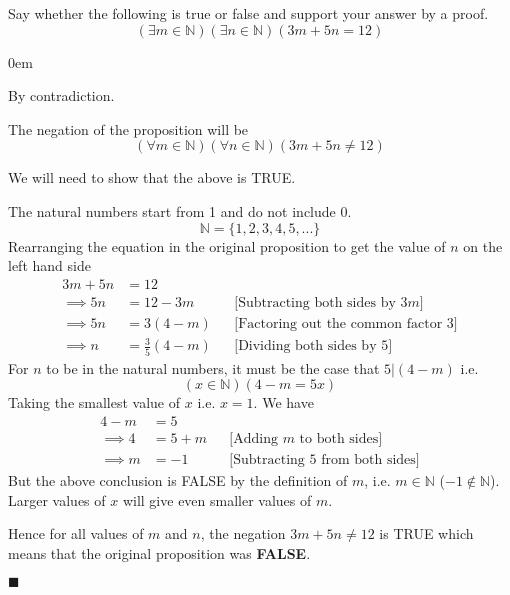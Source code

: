 \documentclass[12pt]{article}
\newcommand{\N}{\mathbb{N}}
\renewcommand{\qed}{\hfill$\blacksquare$}
\renewenvironment{proof}{\begin{addmargin}[1em]{0em}\begin{newproof}}{\end{newproof}\end{addmargin}\qed}
\newenvironment{problem}[2][Problem]{\begin{trivlist}
\item[\hskip \labelsep {\bfseries #1}\hskip \labelsep {\bfseries #2.}]}{\end{trivlist}}
\begin{document}

 

 
\begin{problem}{1} %
    Say whether the following is true or false and support your answer by a proof. 
    $$(\exists m \in \N) (\exists n \in \N) (3m+5n = 12)$$
\end{problem}
 
\begin{proof}
By contradiction.

The negation of the proposition will be
$$(\forall m \in \N) (\forall n \in \N) (3m+5n \neq 12)$$

We will need to show that the above is TRUE.

The natural numbers start from 1 and do not include 0.
$$ \N = \{1,2,3,4,5,...\} $$
Rearranging the equation in the original proposition to get the value of $n$ on the left hand side
\begin{align*}
     3m+5n &= 12 \\
    \implies 5n &= 12 - 3m &&\text{[Subtracting both sides by 3$m$]} \\
    \implies 5n &= 3(4-m) &&\text{[Factoring out the common factor 3]} \\
    \implies n &= \frac{3}{5}(4-m) &&\text{[Dividing both sides by 5]}
\end{align*}
For $n$ to be in the natural numbers, it must be the case that $5 | (4-m)$ i.e.
$$(x \in \N)(4 - m = 5x)$$
Taking the smallest value of $x$ i.e. $x=1$. We have
\begin{align*}
    4-m &= 5 \\
    \implies 4 &= 5+m &&\text{[Adding $m$ to both sides]} \\
    \implies m &= -1 &&\text{[Subtracting 5 from both sides]}
\end{align*}
But the above conclusion is FALSE by the definition of $m$, i.e. $m \in \N$ ($-1 \notin \N$).
Larger values of $x$ will give even smaller values of $m$.

\hfill \break
Hence for all values of $m$ and $n$, the negation $3m+5n \neq 12$ is TRUE which means that the original proposition was \textbf{FALSE}.
\end{proof}
\end{document}
